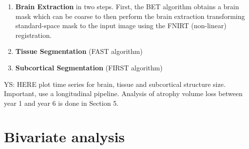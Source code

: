 \documentclass[11pt]{article}
\theoremstyle{definition}
\theoremstyle{remark}
\begin{document}
\begin{enumerate}
  \item \textbf{Brain Extraction} in two steps. First, the BET algorithm obtains a brain mask which can be coarse to then perform the brain extraction transforming standard-space mask to the input image using the FNIRT (non-linear) registration.
  \item \textbf{Tissue Segmentation} (FAST algorithm)
  \item \textbf{Subcortical Segmentation} (FIRST algorithm)
\end{enumerate}

YS: HERE plot time series for brain, tissue and subcortical structure size. Important, use a longitudinal pipeline. 
Analysis of atrophy volume loss between year 1 and year 6 is done in Section 5.


\section{Bivariate analysis}
\label{se:met}
\end{document}
